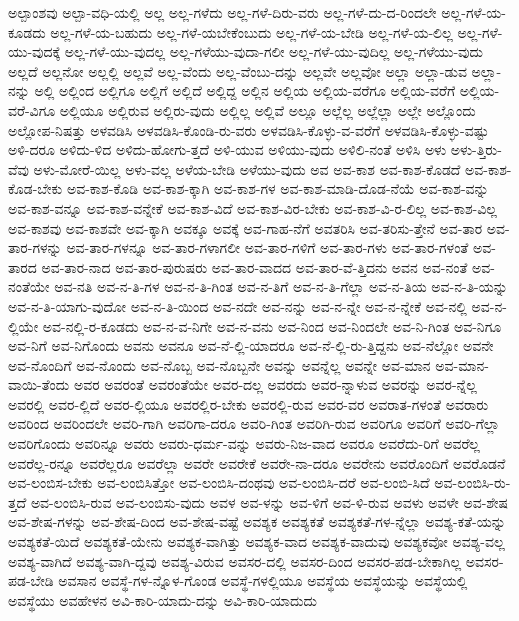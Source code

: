 {ಅಲ್ಪಾಂಶವು
ಅಲ್ಪಾ-ವಧಿ-ಯಲ್ಲಿ
ಅಲ್ಲ
ಅಲ್ಲ-ಗಳೆದು
ಅಲ್ಲ-ಗಳೆ-ದಿರು-ವರು
ಅಲ್ಲ-ಗಳೆ-ದು-ದ-ರಿಂದಲೇ
ಅಲ್ಲ-ಗಳೆ-ಯ-ಕೂಡದು
ಅಲ್ಲ-ಗಳೆ-ಯ-ಬಹುದು
ಅಲ್ಲ-ಗಳೆ-ಯಬೇಕೆಂಬುದು
ಅಲ್ಲ-ಗಳೆ-ಯ-ಬೇಡಿ
ಅಲ್ಲ-ಗಳೆ-ಯ-ಲಿಲ್ಲ
ಅಲ್ಲ-ಗಳೆ-ಯು-ವುದಕ್ಕೆ
ಅಲ್ಲ-ಗಳೆ-ಯು-ವುದಲ್ಲ
ಅಲ್ಲ-ಗಳೆಯು-ವುದಾ-ಗಲೀ
ಅಲ್ಲ-ಗಳೆ-ಯು-ವುದಿಲ್ಲ
ಅಲ್ಲ-ಗಳೆಯು-ವುದು
ಅಲ್ಲದೆ
ಅಲ್ಲನೋ
ಅಲ್ಲಲ್ಲಿ
ಅಲ್ಲವೆ
ಅಲ್ಲ-ವೆಂದು
ಅಲ್ಲ-ವೆಂಬು-ದನ್ನು
ಅಲ್ಲವೇ
ಅಲ್ಲವೋ
ಅಲ್ಲಾ
ಅಲ್ಲಾ-ಡುವ
ಅಲ್ಲಾ-ನನ್ನು
ಅಲ್ಲಿ
ಅಲ್ಲಿಂದ
ಅಲ್ಲಿಗೂ
ಅಲ್ಲಿಗೆ
ಅಲ್ಲಿದೆ
ಅಲ್ಲಿದ್ದ
ಅಲ್ಲಿನ
ಅಲ್ಲಿಯ
ಅಲ್ಲಿಯ-ವರೆಗೂ
ಅಲ್ಲಿಯ-ವರೆಗೆ
ಅಲ್ಲಿಯ-ವರೆ-ವಿಗೂ
ಅಲ್ಲಿಯೂ
ಅಲ್ಲಿರುವ
ಅಲ್ಲಿರು-ವುದು
ಅಲ್ಲಿಲ್ಲ
ಅಲ್ಲಿವೆ
ಅಲ್ಲೂ
ಅಲ್ಲೆಲ್ಲ
ಅಲ್ಲೆಲ್ಲಾ
ಅಲ್ಲೇ
ಅಲ್ಲೊಂದು
ಅಲ್ಲೋಪ-ನಿಷತ್ತು
ಅಳವಡಿಸಿ
ಅಳವಡಿಸಿ-ಕೊಂಡಿ-ರು-ವರು
ಅಳವಡಿಸಿ-ಕೊಳ್ಳು-ವ-ವರೆಗೆ
ಅಳವಡಿಸಿ-ಕೊಳ್ಳು-ವಷ್ಟು
ಅಳಿ-ದರೂ
ಅಳಿದು-ಳಿದ
ಅಳಿದು-ಹೋಗು-ತ್ತದೆ
ಅಳಿ-ಯುವ
ಅಳಿಯು-ವುದು
ಅಳಿಲಿ-ನಂತೆ
ಅಳಿಸಿ
ಅಳು
ಅಳು-ತ್ತಿರು-ವೆವು
ಅಳು-ಮೋರೆ-ಯಿಲ್ಲ
ಅಳು-ವಲ್ಲ
ಅಳೆಯ-ಬೇಡಿ
ಅಳೆಯು-ವುದು
ಅವ
ಅವ-ಕಾಶ
ಅವ-ಕಾಶ-ಕೊಡದೆ
ಅವ-ಕಾಶ-ಕೊಡ-ಬೇಕು
ಅವ-ಕಾಶ-ಕೊಡಿ
ಅವ-ಕಾಶ-ಕ್ಕಾಗಿ
ಅವ-ಕಾಶ-ಗಳ
ಅವ-ಕಾಶ-ಮಾಡಿ-ದೊಡ-ನೆಯೆ
ಅವ-ಕಾಶ-ವನ್ನು
ಅವ-ಕಾಶ-ವನ್ನೂ
ಅವ-ಕಾಶ-ವನ್ನೇಕೆ
ಅವ-ಕಾಶ-ವಿದೆ
ಅವ-ಕಾಶ-ವಿರ-ಬೇಕು
ಅವ-ಕಾಶ-ವಿ-ರ-ಲಿಲ್ಲ
ಅವ-ಕಾಶ-ವಿಲ್ಲ
ಅವ-ಕಾಶವು
ಅವ-ಕಾಶವೇ
ಅವ-ಕ್ಕಾಗಿ
ಅವಕ್ಕೂ
ಅವಕ್ಕೆ
ಅವ-ಗಾಹ-ನೆಗೆ
ಅವತರಿಸಿ
ಅವ-ತರಿಸು-ತ್ತೇನೆ
ಅವ-ತಾರ
ಅವ-ತಾರ-ಗಳನ್ನು
ಅವ-ತಾರ-ಗಳನ್ನೂ
ಅವ-ತಾರ-ಗಳಾಗಲೀ
ಅವ-ತಾರ-ಗಳಿಗೆ
ಅವ-ತಾರ-ಗಳು
ಅವ-ತಾರ-ಗಳಂತೆ
ಅವ-ತಾರದ
ಅವ-ತಾರ-ನಾದ
ಅವ-ತಾರ-ಪುರುಷರು
ಅವ-ತಾರ-ವಾದದ
ಅವ-ತಾರ-ವೆ-ತ್ತಿದನು
ಅವನ
ಅವ-ನಂತೆ
ಅವ-ನಂತೆಯೇ
ಅವ-ನತಿ
ಅವ-ನ-ತಿ-ಗಳ
ಅವ-ನ-ತಿ-ಗಿಂತ
ಅವ-ನ-ತಿಗೆ
ಅವ-ನ-ತಿ-ಗೆಲ್ಲಾ
ಅವ-ನ-ತಿಯ
ಅವ-ನ-ತಿ-ಯನ್ನು
ಅವ-ನ-ತಿ-ಯಾಗು-ವುದೋ
ಅವ-ನ-ತಿ-ಯಿಂದ
ಅವ-ನದೇ
ಅವ-ನನ್ನು
ಅವ-ನ-ನ್ನೇ
ಅವ-ನ-ನ್ನೇಕೆ
ಅವ-ನಲ್ಲಿ
ಅವ-ನ-ಲ್ಲಿಯೇ
ಅವ-ನಲ್ಲಿ-ರ-ಕೂಡದು
ಅವ-ನ-ವ-ನಿಗೇ
ಅವ-ನ-ವನು
ಅವ-ನಿಂದ
ಅವ-ನಿಂದಲೇ
ಅವ-ನಿ-ಗಿಂತ
ಅವ-ನಿಗೂ
ಅವ-ನಿಗೆ
ಅವ-ನಿಗೊಂದು
ಅವನು
ಅವನೂ
ಅವ-ನೆ-ಲ್ಲಿ-ಯಾದರೂ
ಅವ-ನೆ-ಲ್ಲಿ-ರು-ತ್ತಿದ್ದನು
ಅವ-ನೆಲ್ಲೋ
ಅವನೇ
ಅವ-ನೊಂದಿಗೆ
ಅವ-ನೊಂದು
ಅವ-ನೊಬ್ಬ
ಅವ-ನೊಬ್ಬನೇ
ಅವನ್ನು
ಅವನ್ನೆಲ್ಲ
ಅವನ್ನೇ
ಅವ-ಮಾನ
ಅವ-ಮಾನ-ವಾಯಿ-ತೆಂದು
ಅವರ
ಅವರಂತೆ
ಅವರಂತೆಯೇ
ಅವರ-ದಲ್ಲ
ಅವರದು
ಅವರ-ನ್ನಾಳುವ
ಅವರನ್ನು
ಅವರ-ನ್ನೆಲ್ಲ
ಅವರಲ್ಲಿ
ಅವರ-ಲ್ಲಿದೆ
ಅವರ-ಲ್ಲಿಯೂ
ಅವರಲ್ಲಿರ-ಬೇಕು
ಅವರಲ್ಲಿ-ರುವ
ಅವರ-ವರ
ಅವರಾತ-ಗಳಂತೆ
ಅವರಾರು
ಅವರಿಂದ
ಅವರಿಂದಲೇ
ಅವರಿ-ಗಾಗಿ
ಅವರಿಗಾ-ದರೂ
ಅವರಿ-ಗಿಂತ
ಅವರಿಗಿ-ರುವ
ಅವರಿಗೂ
ಅವರಿಗೆ
ಅವರಿ-ಗೆಲ್ಲಾ
ಅವರಿಗೊಂದು
ಅವರಿನ್ನೂ
ಅವರು
ಅವರು-ಧರ್ಮ-ವನ್ನು
ಅವರು-ನಿಜ-ವಾದ
ಅವರೂ
ಅವರೆದು-ರಿಗೆ
ಅವರೆಲ್ಲ
ಅವರೆಲ್ಲ-ರನ್ನೂ
ಅವರೆಲ್ಲರೂ
ಅವರೆಲ್ಲಾ
ಅವರೇ
ಅವರೇಕೆ
ಅವರೇ-ನಾ-ದರೂ
ಅವರೇನು
ಅವರೊಂದಿಗೆ
ಅವರೊಡನೆ
ಅವ-ಲಂಬಿಸ-ಬೇಕು
ಅವ-ಲಂಬಿಸಿತ್ತೋ
ಅವ-ಲಂಬಿಸಿ-ದಂಥವು
ಅವ-ಲಂಬಿಸಿ-ದರೆ
ಅವ-ಲಂಬಿ-ಸಿದೆ
ಅವ-ಲಂಬಿಸಿ-ರು-ತ್ತದೆ
ಅವ-ಲಂಬಿಸಿ-ರುವ
ಅವ-ಲಂಬಿಸು-ವುದು
ಅವಳ
ಅವ-ಳನ್ನು
ಅವ-ಳಿಗೆ
ಅವ-ಳಿ-ರುವ
ಅವಳು
ಅವಳೇ
ಅವ-ಶೇಷ
ಅವ-ಶೇಷ-ಗಳನ್ನು
ಅವ-ಶೇಷ-ದಿಂದ
ಅವ-ಶೇಷ-ವಷ್ಟೆ
ಅವಶ್ಯಕ
ಅವಶ್ಯಕತೆ
ಅವಶ್ಯಕತೆ-ಗಳ-ನ್ನೆಲ್ಲಾ
ಅವಶ್ಯ-ಕತೆ-ಯನ್ನು
ಅವಶ್ಯಕತೆ-ಯಿದೆ
ಅವಶ್ಯಕತೆ-ಯೇನು
ಅವಶ್ಯಕ-ವಾಗಿತ್ತು
ಅವಶ್ಯಕ-ವಾದ
ಅವಶ್ಯಕ-ವಾದುವು
ಅವಶ್ಯಕವೋ
ಅವಶ್ಯ-ವಲ್ಲ
ಅವಶ್ಯ-ವಾಗಿದೆ
ಅವಶ್ಯ-ವಾಗಿ-ದ್ದವು
ಅವಶ್ಯ-ವಿರುವ
ಅವಸರ-ದಲ್ಲಿ
ಅವಸರ-ದಿಂದ
ಅವಸರ-ಪಡ-ಬೇಕಾಗಿಲ್ಲ
ಅವಸರ-ಪಡ-ಬೇಡಿ
ಅವಸಾನ
ಅವಸ್ಥೆ-ಗಳ-ನ್ನೊಳ-ಗೊಂಡ
ಅವಸ್ಥೆ-ಗಳಲ್ಲಿಯೂ
ಅವಸ್ಥೆಯ
ಅವಸ್ಥೆಯನ್ನು
ಅವಸ್ಥೆಯಲ್ಲಿ
ಅವಸ್ಥೆಯು
ಅವಹೇಳನ
ಅವಿ-ಕಾರಿ-ಯಾದು-ದನ್ನು
ಅವಿ-ಕಾರಿ-ಯಾದುದು
}
